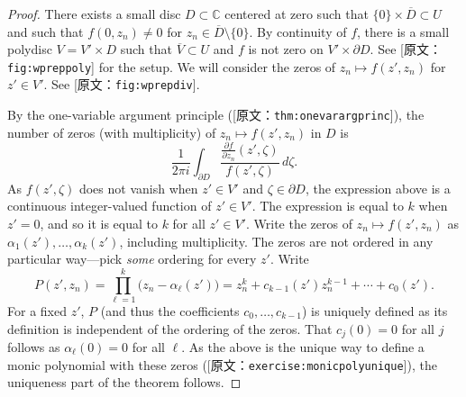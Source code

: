 \documentclass[UTF8,11pt]{ctexart}
\theoremstyle{definition}
\newcommand{\C}{\mathbb C}
\newcommand{\widebar}[1]{\overline{#1}}
\newcommand{\sourceref}[1]{\textnormal{[原文：\nolinkurl{#1}]}}
\newcommand{\thmref}[1]{\sourceref{#1}}
\newcommand{\exerciseref}[1]{\sourceref{#1}}
\newcommand{\figureref}[1]{\sourceref{#1}}
\begin{document}
\begin{proof}
There exists a small disc $D\subset\C$ centered at zero such that $\{0\}\times\widebar D\subset U$ and such that $f(0,z_n)\neq0$ for $z_n\in\widebar D\setminus\{0\}$. By continuity of $f$, there is a small polydisc $V=V'\times D$ such that $\widebar V\subset U$ and $f$ is not zero on $V'\times\partial D$. See \figureref{fig:wpreppoly} for the setup. We will consider the zeros of $z_n\mapsto f(z',z_n)$ for $z'\in V'$. See \figureref{fig:wprepdiv}.

By the one-variable argument principle (\thmref{thm:onevarargprinc}), the number of zeros (with multiplicity) of $z_n\mapsto f(z',z_n)$ in $D$ is
\[
\frac1{2\pi i}\int_{\partial D}\frac{\frac{\partial f}{\partial z_n}(z',\zeta)}{f(z',\zeta)}\,d\zeta.
\]
As $f(z',\zeta)$ does not vanish when $z'\in V'$ and $\zeta\in\partial D$, the expression above is a continuous integer-valued function of $z'\in V'$. The expression is equal to $k$ when $z'=0$, and so it is equal to $k$ for all $z'\in V'$.
Write the zeros of $z_n\mapsto f(z',z_n)$ as $\alpha_1(z'),\ldots,\alpha_k(z')$, including multiplicity. The zeros are not ordered in any particular way---pick \emph{some} ordering for every $z'$. Write
\[
P(z',z_n)=\prod_{\ell=1}^k\bigl(z_n-\alpha_\ell(z')\bigr)=z_n^k+c_{k-1}(z')z_n^{k-1}+\cdots+c_0(z').
\]
For a fixed $z'$, $P$ (and thus the coefficients $c_0,\ldots,c_{k-1}$) is uniquely defined as its definition is independent of the ordering of the zeros. That $c_j(0)=0$ for all $j$ follows as $\alpha_\ell(0)=0$ for all $\ell$. As the above is the unique way to define a monic polynomial with these zeros (\exerciseref{exercise:monicpolyunique}), the uniqueness part of the theorem follows.


\end{proof}
\end{document}
